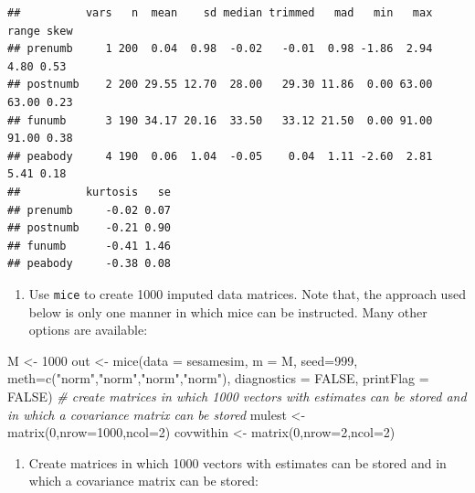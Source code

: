 \documentclass[
]{book}
\newenvironment{Shaded}{\begin{snugshade}}{\end{snugshade}}
\newcommand{\AttributeTok}[1]{\textcolor[rgb]{0.77,0.63,0.00}{#1}}
\newcommand{\CommentTok}[1]{\textcolor[rgb]{0.56,0.35,0.01}{\textit{#1}}}
\newcommand{\ConstantTok}[1]{\textcolor[rgb]{0.00,0.00,0.00}{#1}}
\newcommand{\DecValTok}[1]{\textcolor[rgb]{0.00,0.00,0.81}{#1}}
\newcommand{\FunctionTok}[1]{\textcolor[rgb]{0.00,0.00,0.00}{#1}}
\newcommand{\NormalTok}[1]{#1}
\newcommand{\OtherTok}[1]{\textcolor[rgb]{0.56,0.35,0.01}{#1}}
\newcommand{\StringTok}[1]{\textcolor[rgb]{0.31,0.60,0.02}{#1}}
\providecommand{\tightlist}{%
  \setlength{\itemsep}{0pt}\setlength{\parskip}{0pt}}
\begin{document}
\begin{verbatim}
##          vars   n  mean    sd median trimmed   mad   min   max range skew
## prenumb     1 200  0.04  0.98  -0.02   -0.01  0.98 -1.86  2.94  4.80 0.53
## postnumb    2 200 29.55 12.70  28.00   29.30 11.86  0.00 63.00 63.00 0.23
## funumb      3 190 34.17 20.16  33.50   33.12 21.50  0.00 91.00 91.00 0.38
## peabody     4 190  0.06  1.04  -0.05    0.04  1.11 -2.60  2.81  5.41 0.18
##          kurtosis   se
## prenumb     -0.02 0.07
## postnumb    -0.21 0.90
## funumb      -0.41 1.46
## peabody     -0.38 0.08
\end{verbatim}

\begin{enumerate}
\def\labelenumi{\arabic{enumi})}
\tightlist
\item
  Use \texttt{mice} to create 1000 imputed data matrices. Note that, the approach used
  below is only one manner in which mice can be instructed. Many other options are available:
\end{enumerate}

\begin{Shaded}
\begin{Highlighting}[]
\NormalTok{M }\OtherTok{\textless{}{-}} \DecValTok{1000} 
\NormalTok{out }\OtherTok{\textless{}{-}} \FunctionTok{mice}\NormalTok{(}\AttributeTok{data =}\NormalTok{ sesamesim, }\AttributeTok{m =}\NormalTok{ M, }\AttributeTok{seed=}\DecValTok{999}\NormalTok{, }\AttributeTok{meth=}\FunctionTok{c}\NormalTok{(}\StringTok{"norm"}\NormalTok{,}\StringTok{"norm"}\NormalTok{,}\StringTok{"norm"}\NormalTok{,}\StringTok{"norm"}\NormalTok{), }\AttributeTok{diagnostics =} \ConstantTok{FALSE}\NormalTok{, }\AttributeTok{printFlag =} \ConstantTok{FALSE}\NormalTok{)}
\CommentTok{\# create matrices in which 1000 vectors with estimates can be stored and in which a covariance matrix can be stored}
\NormalTok{mulest }\OtherTok{\textless{}{-}} \FunctionTok{matrix}\NormalTok{(}\DecValTok{0}\NormalTok{,}\AttributeTok{nrow=}\DecValTok{1000}\NormalTok{,}\AttributeTok{ncol=}\DecValTok{2}\NormalTok{)}
\NormalTok{covwithin }\OtherTok{\textless{}{-}} \FunctionTok{matrix}\NormalTok{(}\DecValTok{0}\NormalTok{,}\AttributeTok{nrow=}\DecValTok{2}\NormalTok{,}\AttributeTok{ncol=}\DecValTok{2}\NormalTok{)}
\end{Highlighting}
\end{Shaded}

\begin{enumerate}
\def\labelenumi{\arabic{enumi})}
\setcounter{enumi}{1}
\tightlist
\item
  Create matrices in which 1000 vectors with estimates can be stored and in which a covariance matrix can be stored:
\end{enumerate}
\end{document}
